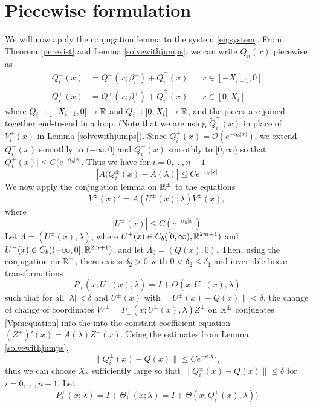 \documentclass[thesis.tex]{subfiles}
\begin{document}
\section{Piecewise formulation}\label{sec:perpiece}

We will now apply the conjugation lemma to the system \cref{eigsystem}. From Theorem \ref{perexist} and Lemma \ref{solvewithjumps}, we can write $Q_n(x)$ piecewise as
\begin{equation}\label{Qnppiece}
\begin{aligned}
Q_i^-(x) &= Q^-(x; \beta_i^-) + \tilde{Q}_i^-(x) && x \in [-X_{i-1}, 0] \\
Q_i^+(x) &= Q^+(x; \beta_i^+) + \tilde{Q}_i^+(x) && x \in [0, X_i]
\end{aligned}
\end{equation}
where $Q_i^-: [-X_{i-1}, 0] \rightarrow \mathbb{R}$ and $Q_i^+: [0, X_i] \rightarrow \mathbb{R}$, and the pieces are joined together end-to-end in a loop. (Note that we are using $\tilde{Q}_i^-(x)$ in place of $V_i^\pm(x)$ in Lemma \ref{solvewithjumps}). Since $Q_i^\pm(x) = \mathcal{O}(e^{-\alpha_0 |x|})$, we extend $Q_i^-(x)$ smoothly to $(-\infty, 0]$ and $Q_i^+(x)$ smoothly to $[0, \infty)$ so that $Q_i^\pm(x)| \leq C (e^{-\alpha_0 |x|}$. Thus we have for $i = 0, \dots, n-1$
\[
|A(Q_i^\pm(x) - A(\lambda)| \leq C e^{-\alpha_0 |x|}
\]
We now apply the conjugation lemma on $\mathbb{R}^\pm$ to the equations
\begin{equation}\label{Vpmequation}
V^\pm(x)' = A(U^\pm(x); \lambda) V^\pm(x),
\end{equation}
where
\[
|U^\pm(x)| \leq C (e^{-\alpha_0 |x|})
\]
Let $\Lambda = (U^\pm(x), \lambda)$, where $U^+(x) \in C_b([0, \infty), \mathbb{R}^{2m+1})$ and $U^-(x) \in C_b((-\infty, 0], \mathbb{R}^{2m+1})$, and let $\Lambda_0 = (Q(x), 0)$. Then, using the conjugation on $\mathbb{R}^\pm$, there exists $\delta_2 > 0$ with $0 < \delta_2 \leq \delta_1$ and invertible linear transformations
\[
P_\pm(x; U^\pm(x), \lambda) = I + \Theta(x; U^\pm(x), \lambda)
\]
such that for all $|\lambda| < \delta$ and $U^\pm(x)$ with $\|U^\pm(x) - Q(x) \| < \delta$, the change of change of coordinates $W^\pm = P_\pm(x; U^\pm(x), \lambda) Z^\pm$ on $\mathbb{R}^\pm$ conjugates \cref{Vpmequation} into the into the constant-coefficient equation $(Z^\pm)'(x) = A(\lambda) Z^\pm(x)$. Using the estimates from Lemma \ref{solvewithjumps}, 
\[
\| Q_i^\pm(x) - Q(x) \| \leq C e^{-\alpha X_*},
\]
thus we can choose $X_*$ sufficiently large so that $\| Q_i^\pm(x) - Q(x) \| \leq \delta$ for $i = 0, \dots, n-1$. Let
\[
P_i^\pm(x; \lambda) = I + \Theta_i^\pm(x; \lambda) = I + \Theta(x; Q_i^\pm(x), \lambda))
\]
\end{document}
